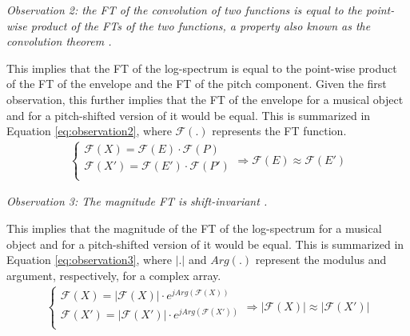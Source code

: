\documentclass[journal]{IEEEtran}
\begin{document}
\emph{Observation 2: the FT of the convolution of two functions is equal to the point-wise product of the FTs of the two functions, a property also known as the convolution theorem \cite{proakis1995}.}

This implies that the FT of the log-spectrum is equal to the point-wise product of the FT of the envelope and the FT of the pitch component. Given the first observation, this further implies that the FT of the envelope for a musical object and for a pitch-shifted version of it would be equal. This is summarized in Equation \ref{eq:observation2}, where $\mathcal{F}(.)$ represents the FT function.
\begin{equation}
\label{eq:observation2}
\begin{split}
\begin{cases}
\mathcal{F}(X) = \mathcal{F}(E) \cdot \mathcal{F}(P) \\
\mathcal{F}(X') = \mathcal{F}(E') \cdot \mathcal{F}(P') \\
\end{cases}
\Rightarrow \mathcal{F}(E) \approx \mathcal{F}(E')
\end{split}
\end{equation}

\emph{Observation 3: The magnitude FT is shift-invariant \cite{proakis1995}.}

This implies that the magnitude of the FT of the log-spectrum for a musical object and for a pitch-shifted version of it would be equal. This is summarized in Equation \ref{eq:observation3}, where $|.|$ and $Arg(.)$ represent the modulus and argument, respectively, for a complex array. 
\begin{equation}
\label{eq:observation3}
\begin{split}
\begin{cases}
\mathcal{F}(X) = |\mathcal{F}(X)| \cdot e^{j Arg(\mathcal{F}(X))} \\
\mathcal{F}(X') = |\mathcal{F}(X')| \cdot e^{j Arg(\mathcal{F}(X'))} \\
\end{cases}
\Rightarrow |\mathcal{F}(X)| \approx |\mathcal{F}(X')|
\end{split}
\end{equation}
\end{document}
